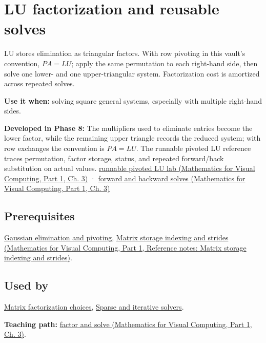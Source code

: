 \hypertarget{appendix-55e4b5b0a1e6}{}\label{referencestart:appendix-55e4b5b0a1e6}
\section{LU factorization and reusable solves}\label{appendix-55e4b5b0a1e6-lu-factorization-and-reusable-solves}

\hypertarget{appendix-55e4b5b0a1e6-lu-factorization-and-reusable-solves}{}

LU stores elimination as triangular factors. With row pivoting in this vault's convention, \(PA=LU\); apply the same permutation to each right-hand side, then solve one lower- and one upper-triangular system. Factorization cost is amortized across repeated solves.

\textbf{Use it when:} solving square general systems, especially with multiple right-hand sides.

\textbf{Developed in Phase 8:} The multipliers used to eliminate entries become the lower factor, while the remaining upper triangle records the reduced system; with row exchanges the convention is \(PA=LU\). The runnable pivoted LU reference traces permutation, factor storage, status, and repeated forward/back substitution on actual values. \href{../02-Mathematics-for-Visual-Computing-P01/main.pdf\#nameddest=01-foundations-i-ch019-a-runnable-pivoted-lu-reference-preserves-the-elimination-history}{runnable pivoted LU lab (Mathematics for Visual Computing, Part 1, Ch. 3)} · \href{../02-Mathematics-for-Visual-Computing-P01/main.pdf\#nameddest=01-foundations-i-ch019-triangular-solves-perform-the-cheap-second-half}{forward and backward solves (Mathematics for Visual Computing, Part 1, Ch. 3)}

\subsection{Prerequisites}\label{appendix-55e4b5b0a1e6-prerequisites}

\hypertarget{appendix-55e4b5b0a1e6-prerequisites}{}

\hyperref[appendix-f6e77f4a200f]{Gaussian elimination and pivoting}, \href{../02-Mathematics-for-Visual-Computing-P01/main.pdf\#nameddest=appendix-ffdc1d4e5350}{Matrix storage indexing and strides (Mathematics for Visual Computing, Part 1, Reference notes: Matrix storage indexing and strides)}.

\subsection{Used by}\label{appendix-55e4b5b0a1e6-used-by}

\hypertarget{appendix-55e4b5b0a1e6-used-by}{}

\hyperref[appendix-221a483bec2d]{Matrix factorization choices}, \hyperref[appendix-67c87a3d9e94]{Sparse and iterative solvers}.

\textbf{Teaching path:} \href{../02-Mathematics-for-Visual-Computing-P01/main.pdf\#nameddest=01-foundations-i-ch019-elimination-turns-the-geometry-into-an-auditable-calculation}{factor and solve (Mathematics for Visual Computing, Part 1, Ch. 3)}.
